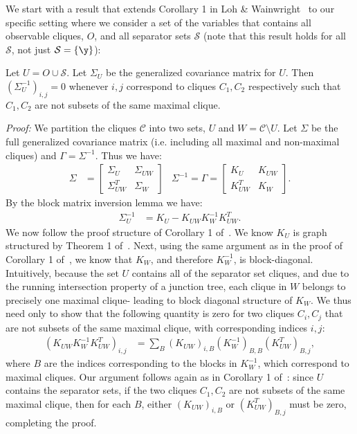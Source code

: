 \documentclass[letterpaper]{article}
\begin{document}
\begin{appendix}
We start with a result that extends Corollary 1 in Loh \& Wainwright~\cite{loh2012structure} to our specific setting where we consider a set of the variables that contains all observable cliques, $O$, and all separator sets $\mathcal{S}$ (note that this result holds for all $\mathcal{S}$, not just $\mathcal{S} = \{\y\}$):

\begin{corollary}
	\label{cor:o-h-partition}
	Let $U = O \cup \mathcal{S}$.
	Let $\Sigma_U$ be the generalized covariance matrix for $U$.
	Then $(\Sigma_U^{-1})_{i,j} = 0$ whenever $i,j$ correspond to cliques $C_1, C_2$ respectively such that $C_1, C_2$ are not subsets of the same maximal clique.
\end{corollary}
\textit{Proof:}
We partition the cliques $\mathcal{C}$ into two sets, $U$ and $W = \mathcal{C} \setminus U$.
Let $\Sigma$ be the full generalized covariance matrix (i.e. including all maximal and non-maximal cliques) and $\Gamma = \Sigma^{-1}$.
Thus we have:
\begin{align*}
	\Sigma
	&=
	\begin{bmatrix}
		\Sigma_U & \Sigma_{UW} \\
		\Sigma_{UW}^T & \Sigma_W
	\end{bmatrix}
&
	\Sigma^{-1}
	=
	\Gamma
	=
	\begin{bmatrix}
		K_U & K_{UW} \\
		K_{UW}^T & K_W
	\end{bmatrix}.
\end{align*}
By the block matrix inversion lemma we have:
\begin{align*}
	\Sigma_U^{-1}
	&=
	K_U - K_{UW} K_W^{-1} K_{UW}^T.
\end{align*}
We now follow the proof structure of Corollary 1 of~\cite{loh2012structure}.
We know $K_U$ is graph structured by Theorem 1 of~\cite{loh2012structure}.
Next, using the same argument as in the proof of Corollary 1 of~\cite{loh2012structure}, we know that $K_W$, and therefore $K_W^{-1}$, is block-diagonal.
Intuitively, because the set $U$ contains all of the separator set cliques, and due to the running intersection property of a junction tree, each clique in $W$ belongs to precisely one maximal clique- leading to block diagonal structure of $K_W$.
We thus need only to show that the following quantity is zero for two cliques $C_i, C_j$ that are not subsets of the same maximal clique, with corresponding indices $i,j$:
\begin{align*}
	\left( K_{UW} K_W^{-1} K_{UW}^T \right)_{i,j}
	&=
	\sum_{B} (K_{UW})_{i,B} (K_W^{-1})_{B,B} (K_{UW}^T)_{B,j},
\end{align*}
where $B$ are the indices corresponding to the blocks in $K_W^{-1}$, which correspond to maximal cliques.
Our argument follows again as in Corollary 1 of~\cite{loh2012structure}: since $U$ contains the separator sets, if the two cliques $C_1, C_2$ are not subsets of the same maximal clique, then for each $B$, either $(K_{UW})_{i,B}$ or $(K_{UW}^T)_{B,j}$ must be zero, completing the proof.


\end{appendix}
\end{document}
